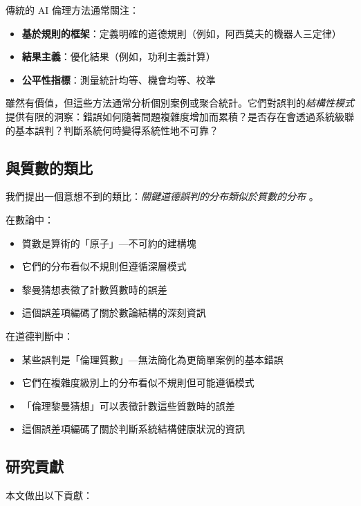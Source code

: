 \documentclass[12pt,a4paper]{article}
\theoremstyle{definition}
\theoremstyle{remark}
\begin{document}
傳統的 AI 倫理方法通常關注：
\begin{itemize}
    \item \textbf{基於規則的框架}：定義明確的道德規則（例如，阿西莫夫的機器人三定律）
    \item \textbf{結果主義}：優化結果（例如，功利主義計算）
    \item \textbf{公平性指標}：測量統計均等、機會均等、校準 \citep{hardt2016,dwork2012}
\end{itemize}

雖然有價值，但這些方法通常分析個別案例或聚合統計。它們對誤判的\emph{結構性模式}提供有限的洞察：錯誤如何隨著問題複雜度增加而累積？是否存在會透過系統級聯的基本誤判？判斷系統何時變得系統性地不可靠？

\subsection{與質數的類比}

我們提出一個意想不到的類比：\emph{關鍵道德誤判的分布類似於質數的分布} \citep{riemann1859,edwards1974}。

在數論中：
\begin{itemize}
    \item 質數是算術的「原子」---不可約的建構塊
    \item 它們的分布看似不規則但遵循深層模式
    \item 黎曼猜想表徵了計數質數時的誤差
    \item 這個誤差項編碼了關於數論結構的深刻資訊
\end{itemize}

在道德判斷中：
\begin{itemize}
    \item 某些誤判是「倫理質數」---無法簡化為更簡單案例的基本錯誤
    \item 它們在複雜度級別上的分布看似不規則但可能遵循模式
    \item 「倫理黎曼猜想」可以表徵計數這些質數時的誤差
    \item 這個誤差項編碼了關於判斷系統結構健康狀況的資訊
\end{itemize}

\subsection{研究貢獻}

本文做出以下貢獻：
\end{document}
